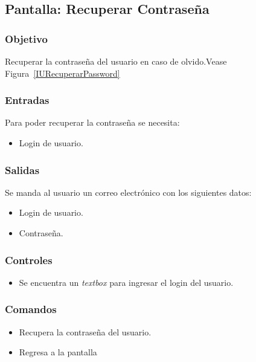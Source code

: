 \subsection{Pantalla: Recuperar Contraseña}
\subsubsection{Objetivo}
Recuperar la contraseña del usuario en caso de olvido.Vease Figura~\ref{IURecuperarPassword}


\subsubsection{Entradas}
Para poder recuperar la contraseña se necesita: 
\begin{itemize}
\item Login de usuario.
\end{itemize}

\subsubsection{Salidas}
Se manda al usuario un correo electrónico con los siguientes datos:
\begin{itemize}
 \item Login de usuario.
 \item Contraseña.
\end{itemize}


\subsubsection{Controles}
\begin{itemize}
 \item Se encuentra un \textit{textbox} para ingresar el login del usuario.
\end{itemize}

\subsubsection{Comandos}
\begin{itemize}
 \item {} Recupera la contraseña del usuario.
 \item {} Regresa a la pantalla
\end{itemize}
